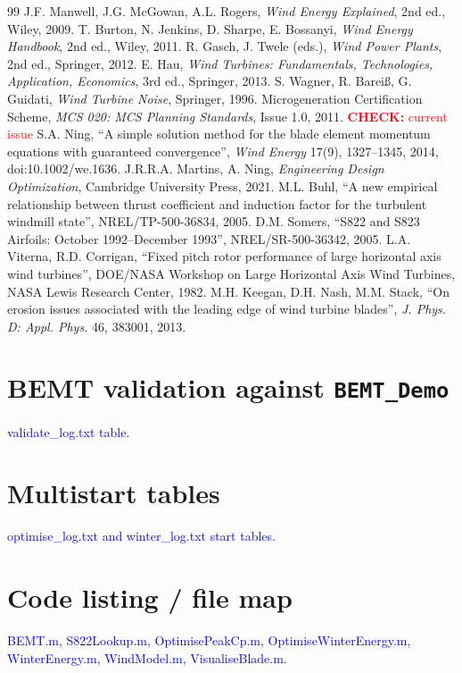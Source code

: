 \documentclass[11pt,a4paper]{article}
\newcommand{\note}[1]{\textcolor{blue}{#1}}
\newcommand{\chk}[1]{\textcolor{red}{\textbf{CHECK:} #1}}
\begin{document}
\begin{thebibliography}{99}
 J.F. Manwell, J.G. McGowan, A.L. Rogers, \emph{Wind Energy Explained}, 2nd ed., Wiley, 2009.
 T. Burton, N. Jenkins, D. Sharpe, E. Bossanyi, \emph{Wind Energy Handbook}, 2nd ed., Wiley, 2011.
 R. Gasch, J. Twele (eds.), \emph{Wind Power Plants}, 2nd ed., Springer, 2012.
 E. Hau, \emph{Wind Turbines: Fundamentals, Technologies, Application, Economics}, 3rd ed., Springer, 2013.
 S. Wagner, R. Bareiß, G. Guidati, \emph{Wind Turbine Noise}, Springer, 1996.
 Microgeneration Certification Scheme, \emph{MCS 020: MCS Planning Standards}, Issue 1.0, 2011. \chk{current issue}
 S.A. Ning, ``A simple solution method for the blade element momentum equations with guaranteed convergence'', \emph{Wind Energy} 17(9), 1327--1345, 2014, doi:10.1002/we.1636.
 J.R.R.A. Martins, A. Ning, \emph{Engineering Design Optimization}, Cambridge University Press, 2021.
 M.L. Buhl, ``A new empirical relationship between thrust coefficient and induction factor for the turbulent windmill state'', NREL/TP-500-36834, 2005.
 D.M. Somers, ``S822 and S823 Airfoils: October 1992--December 1993'', NREL/SR-500-36342, 2005.
 L.A. Viterna, R.D. Corrigan, ``Fixed pitch rotor performance of large horizontal axis wind turbines'', DOE/NASA Workshop on Large Horizontal Axis Wind Turbines, NASA Lewis Research Center, 1982.
 M.H. Keegan, D.H. Nash, M.M. Stack, ``On erosion issues associated with the leading edge of wind turbine blades'', \emph{J. Phys. D: Appl. Phys.} 46, 383001, 2013.
\end{thebibliography}

\appendix
\section{BEMT validation against \texttt{BEMT\_Demo}}  \note{validate\_log.txt table.}
\section{Multistart tables}  \note{optimise\_log.txt and winter\_log.txt start tables.}
\section{Code listing / file map}  \note{BEMT.m, S822Lookup.m, OptimisePeakCp.m, OptimiseWinterEnergy.m, WinterEnergy.m, WindModel.m, VisualiseBlade.m.}
\end{document}
